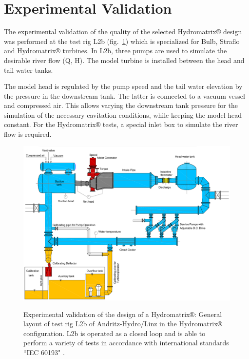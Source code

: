 \FloatBarrier
\section{Experimental Validation}  
The experimental validation of the  quality of the selected Hydromatrix$\circledR$ design was performed at the test rig L2b (fig.\ \ref{exp.lab}) which is specialized for Bulb, Straflo and Hydromatrix$\circledR$ turbines. In L2b, three pumps are used to simulate the desirable river flow (Q, H).  The model turbine is installed between the head and tail water tanks.

The model head is regulated by the pump speed and the tail
water elevation by the pressure in the downstream tank. The latter is connected to a vacuum vessel and compressed air. This allows varying the downstream tank pressure for the simulation of the necessary cavitation conditions, while keeping the model head constant. For the Hydromatrix$\circledR$ tests, a special inlet box to simulate the river flow is required.

\begin{figure}[h!]
\centering
\resizebox*{15.0cm}{!}
{\includegraphics[width=1\textwidth]{lab.eps}}
\caption{Experimental validation of the design of a Hydromatrix$\circledR$: General layout of test rig L2b of Andritz-Hydro/Linz in the Hydromatrix$\circledR$ configuration.
L2b is operated as a closed loop and is able to perform a variety of tests in accordance with international standards ``IEC 60193" \cite{IEC}.}
\label{exp.lab}
\end{figure}

